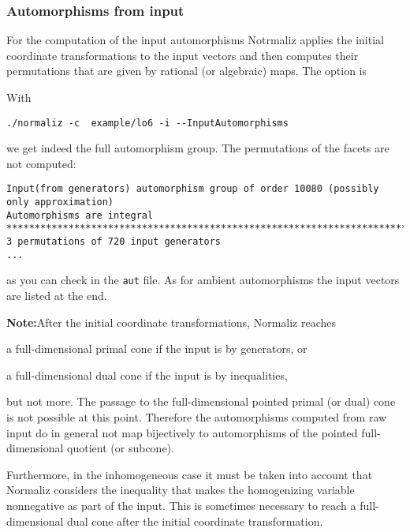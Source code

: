 \subsubsection{Automorphisms from input}\label{input_auto}

For the computation of the input automorphisms Notrmaliz applies the initial coordinate transformations to the input vectors and then computes  their permutations that are given by rational (or algebraic) maps. The option is
\begin{itemize}
	\itemtt[InputAutomorphisms]
\end{itemize}
With
\begin{Verbatim}
./normaliz -c  example/lo6 -i --InputAutomorphisms
\end{Verbatim}
we get indeed the full automorphism group. The permutations of the facets are not computed:
\begin{Verbatim}
Input(from generators) automorphism group of order 10080 (possibly only approximation)
Automorphisms are integral
************************************************************************
3 permutations of 720 input generators
...
\end{Verbatim}
as you can check in the \verb|aut| file. As for ambient automorphisms the input vectors are listed at the end.

\textbf{Note:}\enspace After the initial coordinate transformations, Normaliz reaches
\begin{arab}
\item a full-dimensional primal cone if the input is by generators, or
\item a full-dimensional dual cone if the input is by inequalities,
\end{arab}
but not more. The passage to the full-dimensional pointed primal (or dual) cone is not possible at this point. Therefore the automorphisms computed from raw input do in general not map bijectively to automorphisms of the pointed full-dimensional quotient (or subcone).

Furthermore, in the inhomogeneous case it must be taken into account that Normaliz considers the inequality that makes the homogenizing variable nonnegative as part of the input. This is sometimes necessary to reach a full-dimensional dual cone after the initial coordinate transformation. 

